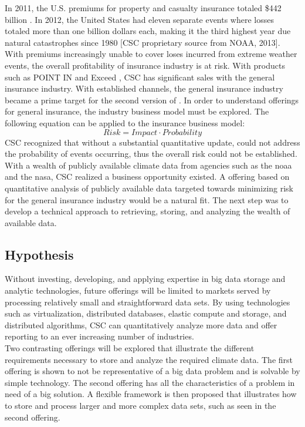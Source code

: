 In 2011, the U.S. premiums for property and casualty insurance totaled \$442 billion \cite{iii}. In 2012, the United States had eleven separate events where losses totaled more than one billion dollars each, making it the third highest year due natural catastrophes since 1980  [\textsc{CSC} proprietary source from NOAA, 2013]. With premiums  increasingly unable to cover loses incurred from extreme weather events, the overall profitability of insurance industry is at risk. With products such as POINT IN \cite{point_in} and Exceed \cite{exceed}, \textsc{CSC} has significant sales with the general insurance industry. With established channels, the general insurance industry became a prime target for the second version of \climatedge. In order to understand offerings for general insurance, the industry business model must be explored. The following equation can be applied to the insurance  business model: 
\begin{equation*}
    Risk = Impact \cdot Probability
\end{equation*}
\textsc{CSC} recognized that without a substantial quantitative update, \climatedge could not address the probability of events occurring, thus the overall risk could not be established. With a wealth of publicly available climate data from agencies such as the \gls{noaa} and the \gls{nasa}, \textsc{CSC} realized a business opportunity existed. A \climatedge offering based on quantitative analysis of publicly available data targeted towards minimizing risk for the general insurance industry would be a natural fit. The next step was to develop a technical approach to retrieving, storing, and analyzing the wealth of available data. 
\subsection{Hypothesis}
Without investing, developing, and applying expertise in big data  storage and analytic technologies, future \climatedge offerings will be limited to markets served by processing relatively small and straightforward data sets. By using technologies such as virtualization, distributed databases, elastic compute and storage, and distributed algorithms, \textsc{CSC} can quantitatively analyze more data and offer \climatedge reporting to an ever increasing number of industries.\\

Two contrasting \climatedge offerings will be explored that illustrate the different requirements necessary to store and analyze the required climate data. The first offering is shown to not be representative of a big data problem and is solvable by simple technology. The second offering has all the characteristics of a problem in need of a big solution. A flexible framework is then proposed that illustrates how to store and process larger and more complex data sets, such as seen in the second offering.
